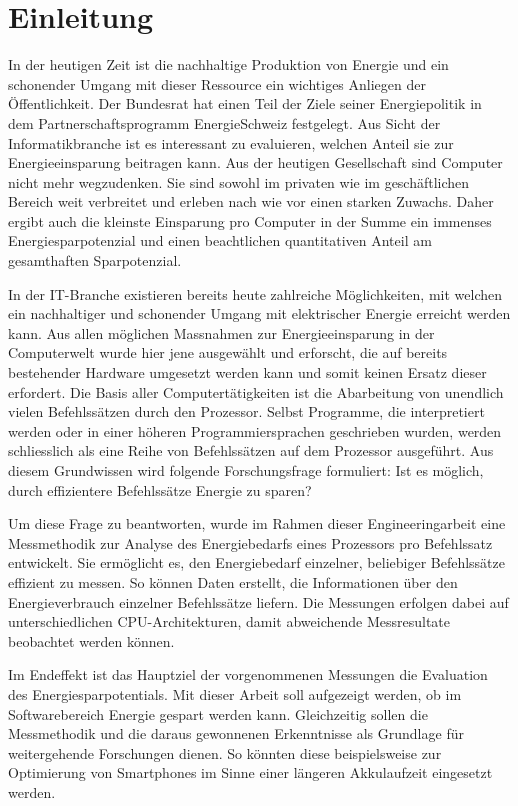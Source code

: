 \chapter{Einleitung}


In der heutigen Zeit ist die nachhaltige Produktion von Energie und ein schonender Umgang mit dieser Ressource ein wichtiges Anliegen der Öffentlichkeit. Der Bundesrat hat einen Teil der Ziele seiner Energiepolitik in dem Partnerschaftsprogramm EnergieSchweiz festgelegt. Aus Sicht der Informatikbranche ist es interessant zu evaluieren, welchen Anteil sie zur Energieeinsparung beitragen kann. Aus der heutigen Gesellschaft sind Computer nicht mehr wegzudenken. Sie sind sowohl im privaten wie im geschäftlichen Bereich weit verbreitet und erleben nach wie vor einen starken Zuwachs. Daher ergibt auch die kleinste Einsparung pro Computer in der Summe ein immenses Energiesparpotenzial und einen beachtlichen quantitativen Anteil am gesamthaften Sparpotenzial. 
\par
In der IT-Branche existieren bereits heute zahlreiche Möglichkeiten, mit welchen ein nachhaltiger und schonender Umgang mit elektrischer Energie erreicht werden kann. Aus allen möglichen Massnahmen zur Energieeinsparung in der Computerwelt wurde hier jene ausgewählt und erforscht, die auf bereits bestehender Hardware umgesetzt werden kann und somit keinen Ersatz dieser erfordert. Die Basis aller Computertätigkeiten ist die Abarbeitung von unendlich vielen Befehlssätzen durch den Prozessor. Selbst Programme, die interpretiert werden oder in einer höheren Programmiersprachen geschrieben wurden, werden schliesslich als eine Reihe von Befehlssätzen auf dem Prozessor ausgeführt. Aus diesem Grundwissen wird folgende Forschungsfrage formuliert: Ist es möglich, durch effizientere Befehlssätze Energie zu sparen?
\par
Um diese Frage zu beantworten, wurde im Rahmen dieser Engineeringarbeit eine Messmethodik zur Analyse des Energiebedarfs eines Prozessors pro Befehlssatz entwickelt. Sie ermöglicht es, den Energiebedarf einzelner, beliebiger Befehlssätze effizient zu messen. So können Daten erstellt, die Informationen über den Energieverbrauch einzelner Befehlssätze liefern. Die Messungen erfolgen dabei auf unterschiedlichen CPU-Architekturen, damit abweichende Messresultate beobachtet werden können.
\par
Im Endeffekt ist das Hauptziel der vorgenommenen Messungen die Evaluation des Energiesparpotentials. Mit dieser Arbeit soll aufgezeigt werden, ob im Softwarebereich Energie gespart werden kann. Gleichzeitig sollen die Messmethodik und die daraus gewonnenen Erkenntnisse als Grundlage für weitergehende Forschungen dienen. So könnten diese beispielsweise zur Optimierung von Smartphones im Sinne einer längeren Akkulaufzeit eingesetzt werden.
